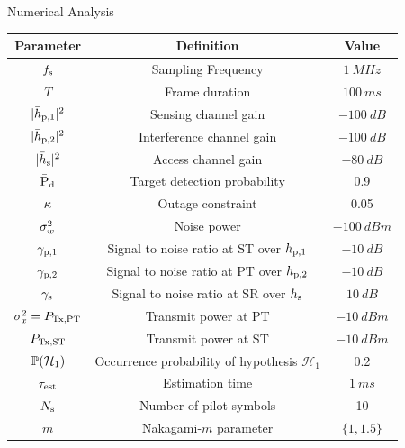 \documentclass[12pt]{beamer}
\newcommand{\fs}[2]{\fontsize{#1 pt}{#2}\selectfont}
\begin{document}
\begin{frame}{Numerical Analysis}
\vspace{-0.2cm}
\fs{8}{8}
\begin{center}
\renewcommand{\arraystretch}{1.35}
\begin{tabular}{c||c|c}
\bfseries Parameter & \bfseries Definition & \bfseries Value \\
\hline\hline
$f_{\text{s}}$ & Sampling Frequency & $\SI{1}{MHz}$ \\ \hline
$T$ & Frame duration & $\SI{100}{ms}$ \\ \hline
$|\bar{h}_{\text{p,1}}|^2$ & Sensing channel gain & $\SI{-100}{dB}$ \\ \hline
$|\bar{h}_{\text{p,2}}|^2$ & Interference channel gain & $\SI{-100}{dB}$ \\ \hline
$|\bar{h}_{\text{s}}|^2$ & Access channel gain & $\SI{-80}{dB}$ \\ \hline 
$\bar{\text{P}}_{\text{d}}$ & Target detection probability & 0.9 \\ \hline 
$\kappa$ & Outage constraint & 0.05  \\ \hline 
$\sigma^2_{w}$ & Noise power & $\SI{-100}{dBm}$ \\ \hline
${\gamma}_{\text{p,1}}$ & Signal to noise ratio at ST over $h_{\text{p,1}}$ & $\SI{-10}{dB}$ \\ \hline
${\gamma}_{\text{p,2}}$ & Signal to noise ratio at PT over $h_{\text{p,2}}$ & $\SI{-10}{dB}$ \\ \hline
${\gamma}_{\text{s}}$ & Signal to noise ratio at SR over $h_{\text{s}}$ & $\SI{10}{dB}$ \\ \hline
$\sigma^2_{x} = P_{\text{Tx,PT}}$ & Transmit power at PT &$-\SI{10}{dBm}$ \\ \hline
$P_{\text{Tx,ST}}$ &Transmit power at ST & $-\SI{10}{dBm}$ \\ \hline
$\mathbb P(\mathcal{H}_1)$ &  Occurrence probability of hypothesis $\mathcal H_1$ & 0.2 \\ \hline
$\tau_{\text{est}}$ & Estimation time & $\SI{1}{ms}$ \\ \hline
$N_{\text{s}}$ & Number of pilot symbols &10 \\ \hline 
$m$& Nakagami-$m$ parameter & $\{1, 1.5\}$  
\end{tabular}
\end{center}
\end{frame}
\end{document}
